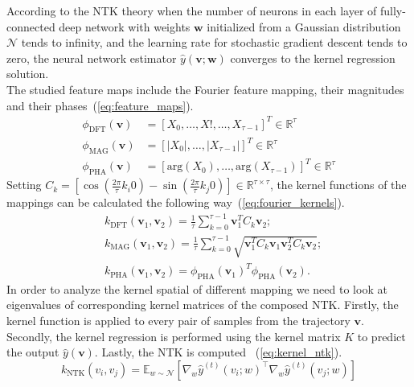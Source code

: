 \documentclass[acmtog]{techreportacmart}
\begin{document}
According to the NTK theory when the number of neurons in each layer of fully-connected deep network with weights ${\mathbf{w}}$ initialized from a Gaussian distribution ${\mathcal{N}}$ tends to infinity, and the learning rate for stochastic gradient descent tends to zero, the neural network estimator ${\hat{y}(\mathbf{v};\mathbf{w})}$ converges to the kernel regression solution. 
\\
The studied feature maps include the Fourier feature mapping, their magnitudes and their phases~(\ref{eq:feature_maps}).
\begin{equation}
  \label{eq:feature_maps}
  \begin{aligned}
  \phi_{\text{DFT}}(\mathbf{v}) &= [X_0, \ldots, X!, \ldots, X_{\tau-1}]^T \in \mathbb{R}^\tau \\
  \phi_{\text{MAG}}(\mathbf{v}) &= [|X_0|, \ldots, |X_{\tau-1}|]^T \in \mathbb{R}^\tau \\
  \phi_{\text{PHA}}(\mathbf{v}) &= [\text{arg}(X_0), \ldots, \text{arg}(X_{\tau-1})]^T \in \mathbb{R}^\tau
  \end{aligned}
\end{equation}
Setting $C_k = [\cos \left(\frac{2\pi}{\tau} k_i 0\right) - \sin \left(\frac{2\pi}{\tau} k_j 0\right)] \in \mathbb{R}^{\tau \times \tau}$, the kernel functions of the mappings can be calculated the following way~(\ref{eq:fourier_kernels}).
\begin{equation} 
  \label{eq:fourier_kernels}
  \begin{aligned}
  & k_{\text{DFT}}(\mathbf{v}_1, \mathbf{v}_2) = \frac{1}{\tau} \sum_{k=0}^{\tau-1} \mathbf{v}_1^T C_k \mathbf{v}_2; \\
  & k_{\text{MAG}}(\mathbf{v}_1, \mathbf{v}_2) = \frac{1}{\tau} \sum_{k=0}^{\tau-1} \sqrt{\mathbf{v}_1^T C_k \mathbf{v}_1 \mathbf{v}_2^T C_k \mathbf{v}_2}; \\
  & k_{\text{PHA}}(\mathbf{v}_1, \mathbf{v}_2) = \phi_{\text{PHA}}(\mathbf{v}_1)^T \phi_{\text{PHA}}(\mathbf{v}_2).
  \end{aligned}
\end{equation}
In order to analyze the kernel spatial of different mapping we need to look at eigenvalues of corresponding kernel matrices of the composed NTK. Firstly, the kernel function is applied to every pair of samples from the trajectory ${\mathbf{v}}$. Secondly, the kernel regression is performed using the kernel matrix ${K}$ to predict the output ${\hat{y}(\mathbf{v})}$. Lastly, the NTK is computed ~(\ref{eq:kernel_ntk}).
\begin{equation}
  \label{eq:kernel_ntk}
  k_{\text{NTK}}(v_i, v_j) = \mathbb{E}_{w \sim \mathcal{N}} \left[ \nabla_{w} \hat{y}^{(t)}(v_i;w)^\top \nabla_{w} \hat{y}^{(t)}(v_j;w) \right]
\end{equation}
\end{document}
